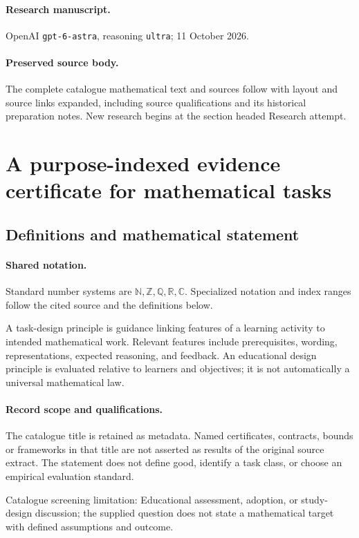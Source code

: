 \documentclass[11pt]{article}
\begin{document}
\paragraph{Research manuscript.} OpenAI \texttt{gpt-6-astra}, reasoning \texttt{ultra}; 11 October 2026.
\paragraph{Preserved source body.} The complete catalogue mathematical text and sources follow with layout and source links expanded, including source qualifications and its historical preparation notes. New research begins at the section headed Research attempt.

\section{A purpose-indexed evidence certificate for mathematical tasks}\label{statement}

\subsection{Definitions and mathematical statement}

\paragraph{Shared notation.}Standard number systems are $\mathbb N,\mathbb Z,\mathbb Q,\mathbb R,\mathbb C$. Specialized notation and index ranges follow the cited source and the definitions below.


A task-design principle is guidance linking features of a learning activity to intended mathematical work. Relevant features include prerequisites, wording, representations, expected reasoning, and feedback. An educational design principle is evaluated relative to learners and objectives; it is not automatically a universal mathematical law.
\paragraph{Record scope and qualifications.}
The catalogue title is retained as metadata. Named certificates, contracts, bounds or frameworks in that title are not asserted as results of the original source extract.
The statement does not define good, identify a task class, or choose an empirical evaluation standard.

Catalogue screening limitation: Educational assessment, adoption, or study-design discussion; the supplied question does not state a mathematical target with defined assumptions and outcome.
\end{document}
